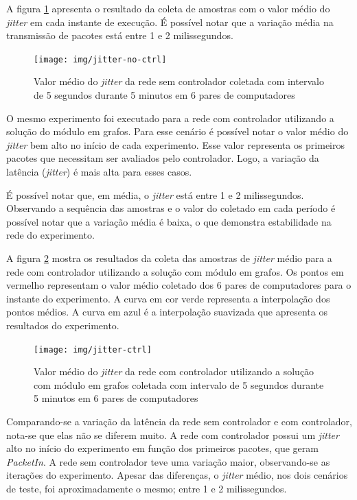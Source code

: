 A figura \ref{fig:jitter-no-ctrl} apresenta o resultado da coleta de amostras
com o valor médio do \emph{jitter} em cada instante de execução.
É possível notar que a variação média na transmissão de pacotes está entre
1 e 2 milissegundos.

\begin{figure}[!htb]
    \centering
    \label{fig:jitter-no-ctrl}
    \texttt{[image: img/jitter-no-ctrl]}
    \caption{Valor médio do \emph{jitter} da rede sem controlador coletada com
    intervalo de 5 segundos durante 5 minutos em 6 pares de computadores}
\end{figure}

O mesmo experimento foi executado para a rede com controlador utilizando a
solução do módulo em grafos.
Para esse cenário é possível notar o valor médio do \emph{jitter} bem alto
no início de cada experimento.
Esse valor representa os primeiros pacotes que necessitam ser avaliados pelo
controlador.
Logo, a variação da latência (\emph{jitter}) é mais alta para esses casos.

É possível notar que, em média, o \emph{jitter} está entre 1 e 2 milissegundos.
Observando a sequência das amostras e o valor do coletado em cada período é
possível notar que a variação média é baixa, o que demonstra estabilidade na
rede do experimento.

A figura \ref{fig:jitter-ctrl} mostra os resultados da coleta das amostras
de \emph{jitter} médio para a rede com controlador utilizando a solução com
módulo em grafos.
Os pontos em vermelho representam o valor médio coletado dos 6 pares de
computadores para o instante do experimento.
A curva em cor verde representa a interpolação dos pontos médios.
A curva em azul é a interpolação suavizada que apresenta os resultados do
experimento.

\break

\begin{figure}[!htb]
    \centering
    \label{fig:jitter-ctrl}
    \texttt{[image: img/jitter-ctrl]}
    \caption{Valor médio do \emph{jitter} da rede com controlador utilizando a
    solução com módulo em grafos coletada com intervalo de 5 segundos durante 5
    minutos em 6 pares de computadores}
\end{figure}

Comparando-se a variação da latência da rede sem controlador e com controlador,
nota-se que elas não se diferem muito.
A rede com controlador possui um \emph{jitter} alto no início do experimento
em função dos primeiros pacotes, que geram \emph{PacketIn}.
A rede sem controlador teve uma variação maior, observando-se as iterações
do experimento.
Apesar das diferenças, o \emph{jitter} médio, nos dois cenários de teste,
foi aproximadamente o mesmo; entre 1 e 2 milissegundos.

